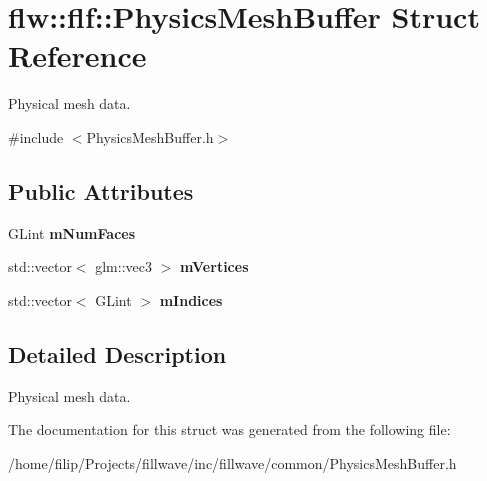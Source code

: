 \hypertarget{structflw_1_1flf_1_1PhysicsMeshBuffer}{}\section{flw\+:\+:flf\+:\+:Physics\+Mesh\+Buffer Struct Reference}
\label{structflw_1_1flf_1_1PhysicsMeshBuffer}


Physical mesh data.  




{\ttfamily \#include $<$Physics\+Mesh\+Buffer.\+h$>$}

\subsection*{Public Attributes}
\begin{DoxyCompactItemize}
\item 
G\+Lint {\bfseries m\+Num\+Faces}\hypertarget{structflw_1_1flf_1_1PhysicsMeshBuffer_a4e3361cdc8b56c4f0f72720a2d92a5e7}{}\label{structflw_1_1flf_1_1PhysicsMeshBuffer_a4e3361cdc8b56c4f0f72720a2d92a5e7}

\item 
std\+::vector$<$ glm\+::vec3 $>$ {\bfseries m\+Vertices}\hypertarget{structflw_1_1flf_1_1PhysicsMeshBuffer_af339e5c24ece37c2dda8fd416f9ceed2}{}\label{structflw_1_1flf_1_1PhysicsMeshBuffer_af339e5c24ece37c2dda8fd416f9ceed2}

\item 
std\+::vector$<$ G\+Lint $>$ {\bfseries m\+Indices}\hypertarget{structflw_1_1flf_1_1PhysicsMeshBuffer_a19cbfc43d96366e8cca09dcbc27c586b}{}\label{structflw_1_1flf_1_1PhysicsMeshBuffer_a19cbfc43d96366e8cca09dcbc27c586b}

\end{DoxyCompactItemize}


\subsection{Detailed Description}
Physical mesh data. 

The documentation for this struct was generated from the following file\+:\begin{DoxyCompactItemize}
\item 
/home/filip/\+Projects/fillwave/inc/fillwave/common/Physics\+Mesh\+Buffer.\+h\end{DoxyCompactItemize}
